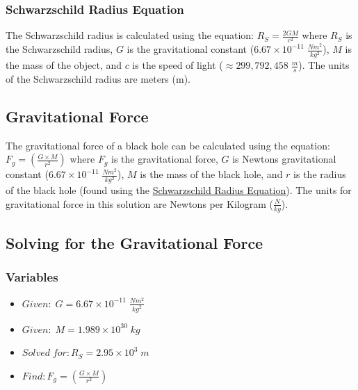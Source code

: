 \documentclass{article}
\begin{document}
\subsubsection{Schwarzschild Radius Equation}\label{sec:schwarzschild_radius_equation}
The Schwarzschild radius is calculated using the equation: $R_{S} = \frac{2GM}{c^2}$ where $R_{S}$ is the Schwarzschild radius, $G$ is the gravitational constant (\hyperref[sec:constants]{$6.67 \times 10^{-11}\;\frac{Nm^2}{kg^2}$}), $M$ is the mass of the object, and $c$ is the speed of light (\hyperref[sec:constants]{$\approx 299, 792, 458\;\frac{m}{s}$}). The units of the Schwarzschild radius are meters (m).

\subsection{Gravitational Force}
The gravitational force of a black hole can be calculated using the equation: $F_g = \left(\frac{G\times M}{r^2}\right)$ where $F_g$ is the gravitational force, $G$ is Newtons gravitational constant (\hyperref[sec:constants]{$6.67 \times 10^{-11}\;\frac{Nm^2}{kg^2}$}), $M$ is the mass of the black hole, and $r$ is the radius of the black hole (found using the \hyperref[sec:schwarzschild_radius_equation]{Schwarzschild Radius Equation}). The units for gravitational force in this solution are Newtons per Kilogram ($\frac{N}{kg}$).

\subsection{Solving for the Gravitational Force}
\subsubsection{Variables}
\begin{itemize}
    \item $Given:\; G = 6.67 \times 10^{-11}\;\frac{Nm^2}{kg^2}$
    \item $Given:\; M = 1.989\times 10^{30}\;kg$
    \item $Solved\; for: R_S = 2.95 \times 10^{3}\;m$
    \item $Find: F_g = \left(\frac{G\times M}{r^2}\right)$
\end{itemize}\leavevmode
\end{document}
